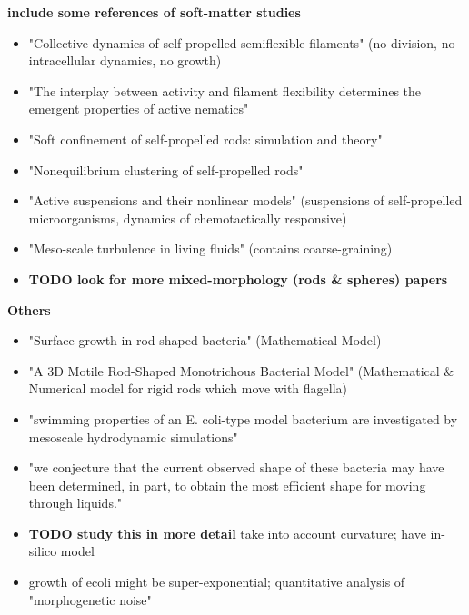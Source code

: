 \documentclass{article}
\begin{document}
\textbf{include some references of soft-matter studies}
\begin{itemize}
    \item \cite{Duman2018} "Collective dynamics of self-propelled semiflexible filaments"
        (no division, no intracellular dynamics, no growth)
    \item \cite{Joshi2019} "The interplay between activity and filament flexibility determines the
        emergent properties of active nematics"
    \item \cite{Modica2024} "Soft confinement of self-propelled rods: simulation and theory"
    \item \cite{Peruani2006} "Nonequilibrium clustering of self-propelled rods"
    \item \cite{Saintillan2013} "Active suspensions and their nonlinear models" (suspensions of
        self-propelled microorganisms, dynamics of chemotactically responsive)
    \item \cite{Wensink2012} "Meso-scale turbulence in living fluids" (contains coarse-graining)
    \item \textbf{TODO look for more mixed-morphology (rods \& spheres) papers}
\end{itemize}

\textbf{Others}
\begin{itemize}
    \item \cite{Rosenberger1978} "Surface growth in rod-shaped bacteria" (Mathematical Model)
    \item \cite{Hsu2009} "A 3D Motile Rod-Shaped Monotrichous Bacterial Model" (Mathematical \&
        Numerical model for rigid rods which move with flagella)
    \item \cite{Hu2015} "swimming properties of an E. coli-type model bacterium are investigated by
        mesoscale hydrodynamic simulations"
    \item \cite{Cooper2006} "we conjecture that the current observed shape of these bacteria may
        have been determined, in part, to obtain the most efficient shape for moving through liquids."
    \item \cite{Schuech2019} \textbf{TODO study this in more detail} take into account curvature;
        have in-silico model
    \item \cite{Cylke2023} growth of \ac{ecoli} might be super-exponential; quantitative analysis of
        "morphogenetic noise"
\end{itemize}
\end{document}
